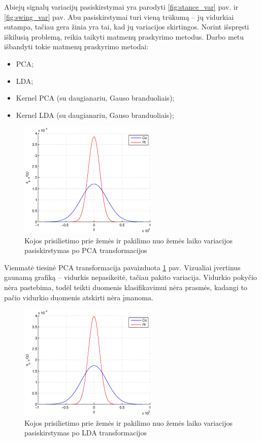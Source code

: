 \documentclass[]{vgtuef}
\begin{document}
Abiejų signalų variacijų pasiskirstymai yra parodyti \ref{fig:stance_var} pav. ir \ref{fig:swing_var} pav. Abu pasiskirstymai turi vieną trūkumą -- jų vidurkiai sutampa, tačiau gera žinia yra tai, kad jų variacijos skirtingos. Norint išspręsti iškilusią problemą, reikia taikyti matmenų praskyrimo metodus. Darbo metu išbandyti tokie matmenų praskyrimo metodai:

\begin{itemize}
\item PCA;
\item LDA;
\item Kernel PCA (su daugianariu, Gauso branduoliais);
\item Kernel LDA (su daugianariu, Gauso branduoliais);
\end{itemize}

\begin{figure}[!t]
  \centering
  \includegraphics[width=250px]{figures/st_sw_linear_kpca.eps}
  \caption{Kojos prisilietimo prie žemės ir pakilimo nuo žemės laiko variacijos pasiskirstymas po PCA transformacijos}
  \label{fig:linear_pca}
\end{figure}

Vienmatė tiesinė PCA transformacija pavaizduota \ref{fig:linear_pca} pav. Vizualiai įvertinus gaunamą grafiką -- vidurkis nepasikeitė, tačiau pakito variacija. Vidurkio pokyčio nėra pastebima, todėl teikti duomenis klasifikavimui nėra prasmės, kadangi to pačio vidurkio duomenis atskirti nėra įmanoma.

\begin{figure}[!t]
  \centering
  \includegraphics[width=250px]{figures/st_sw_linear_lda.eps}
  \caption{Kojos prisilietimo prie žemės ir pakilimo nuo žemės laiko variacijos pasiskirstymas po LDA transformacijos}
  \label{fig:linear_lda}
\end{figure}
\end{document}
